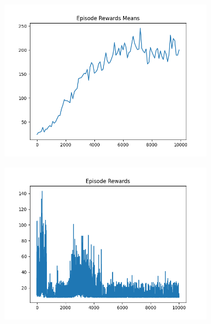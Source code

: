 \begin{figure}[H]
\begin{subfigure}{.47\linewidth}
        \includegraphics[width=\textwidth]{pole/2024-06-14_17-21-25_dqn_cartpole_episode_rewards_means.png}
    \end{subfigure}
    \begin{subfigure}{.47\linewidth}
        \centering
        \includegraphics[width=\textwidth]{pole/2024-06-13_17-34-57_dqn_cartpole_episode_rewards.png}
    \end{subfigure}
\end{figure}
